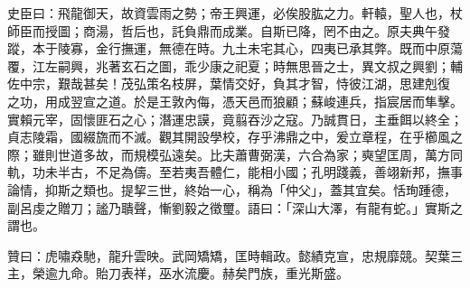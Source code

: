\begin{pinyinscope}
 史臣曰：飛龍御天，故資雲雨之勢；帝王興運，必俟股肱之力。軒轅，聖人也，杖師臣而授圖；商湯，哲后也，託負鼎而成業。自斯已降，罔不由之。原夫典午發蹤，本于陵寡，金行撫運，無德在時。九土未宅其心，四夷已承其弊。既而中原蕩覆，江左嗣興，兆著玄石之圖，乖少康之祀夏；時無思晉之士，異文叔之興劉；輔佐中宗，艱哉甚矣！茂弘策名枝屏，葉情交好，負其才智，恃彼江湖，思建剋復
 之功，用成翌宣之道。於是王敦內侮，憑天邑而狼顧；蘇峻連兵，指宸居而隼擊。實賴元宰，固懷匪石之心；潛運忠謨，竟翦吞沙之寇。乃誠貫日，主垂餌以終全；貞志陵霜，國綴旒而不滅。觀其開設學校，存乎沸鼎之中，爰立章程，在乎櫛風之際；雖則世道多故，而規模弘遠矣。比夫蕭曹弼漢，六合為家；奭望匡周，萬方同軌，功未半古，不足為儔。至若夷吾體仁，能相小國；孔明踐義，善翊新邦，撫事論情，抑斯之類也。提挈三世，終始一心，稱為「仲父」，蓋其宜矣。恬珣踵德，副呂虔之贈刀；謐乃聵聲，慚劉毅之徵璽。語曰：「深山大澤，有龍有蛇。」實斯之謂也。



 贊曰：虎嘯猋馳，龍升雲映。武岡矯矯，匡時輯政。懿績克宣，忠規靡競。契葉三主，榮逾九命。貽刀表祥，巫水流慶。赫矣門族，重光斯盛。



\end{pinyinscope}